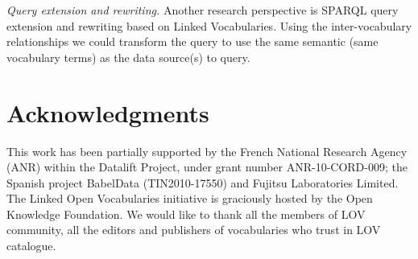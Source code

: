 \documentclass{iosart2c}
\begin{document}
\emph{Query extension and rewriting.} Another research perspective is SPARQL query extension and rewriting based on Linked Vocabularies. Using the inter-vocabulary relationships we could transform the query to use the same semantic (same vocabulary terms) as the data source(s) to query.


\section*{Acknowledgments}
This work has been partially supported by the French National Research Agency (ANR) within the Datalift Project, under grant number ANR-10-CORD-009; the Spanish project BabelData (TIN2010-17550) and Fujitsu Laboratories Limited. The Linked Open Vocabularies initiative is graciously hosted by the Open Knowledge Foundation. We would like to thank all the members of LOV community, all the editors and publishers of vocabularies who trust in LOV catalogue. 




\end{document}
